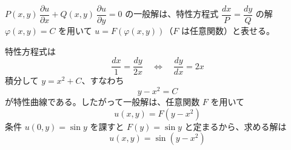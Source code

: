 
$P(x,y)\,\dfrac{\partial u}{\partial x} + Q(x,y)\,\dfrac{\partial u}{\partial y} = 0$ の一般解は、特性方程式 $\dfrac{dx}{P} = \dfrac{dy}{Q}$ の解 $\varphi(x,y) = C$ を用いて $u = F(\varphi(x,y))$（$F$ は任意関数）と表せる。

特性方程式は
\[
\frac{dx}{1} = \frac{dy}{2x}
\quad\Longleftrightarrow\quad
\frac{dy}{dx} = 2x
\]
積分して $y = x^{2} + C$、すなわち
\[
y - x^{2} = C
\]
が特性曲線である。したがって一般解は、任意関数 $F$ を用いて
\[
u(x,y) = F(y - x^{2})
\]
条件 $u(0,y) = \sin y$ を課すと $F(y) = \sin y$ と定まるから、求める解は
\[
\boxed{\; u(x,y) = \sin\left(y - x^{2}\right) \;}
\]
